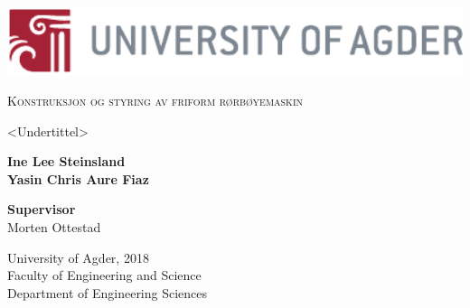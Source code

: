 
\begin{titlepage}

\begin{center}
\includegraphics[width=140mm]{Pics/uia-logo.pdf}

\vspace{1cm}

{\LARGE
\textsc{Konstruksjon og styring av friform r\o rb\o yemaskin }\\

\vspace{0.5cm}

<Undertittel> \\

\vspace{4.5cm}

{\bf{Ine Lee Steinsland\\ 
		Yasin Chris Aure Fiaz\\}}

\vspace{4cm}

{\bf{Supervisor}} \\
Morten Ottestad

\vspace{3cm}


\vspace{2cm}

University of Agder, 2018 \\
Faculty of Engineering and Science \\
Department of Engineering Sciences }

\end{center}
\end{titlepage}
